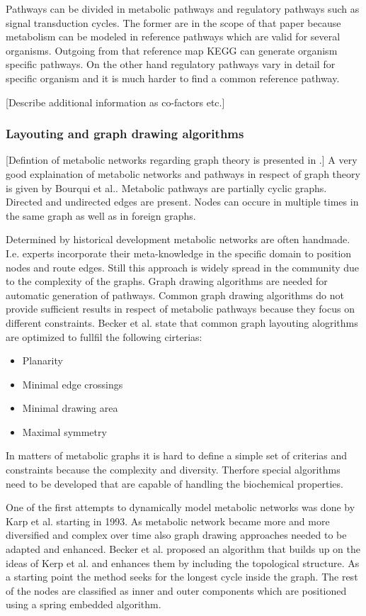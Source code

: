 Pathways can be divided in metabolic pathways and regulatory pathways such as signal transduction cycles. The former are in the scope of that paper because metabolism can be modeled in reference pathways which are valid for several organisms\citep{Kanehisa2000}. Outgoing from that reference map KEGG can generate organism specific pathways. On the other hand regulatory pathways vary in detail for specific organism and it is much harder to find a common reference pathway\citep{Kanehisa2000}.

[Describe additional information as co-factors etc.]

\subsubsection{Layouting and graph drawing algorithms}

[Defintion of metabolic networks regarding graph theory is presented in \citep{Bourqui2006}.]
A very good explaination of metabolic networks and pathways in respect of graph theory is given by Bourqui et al.\citep{Bourqui2006}. 
Metabolic pathways are partially cyclic graphs. Directed and undirected edges are present.
Nodes can occure in multiple times in the same graph as well as in foreign graphs.

Determined by historical development metabolic networks are often handmade. I.e. experts incorporate their meta-knowledge in the specific domain to position nodes and route edges. Still this approach is widely spread in the community due to the complexity of the graphs. Graph drawing algorithms are needed for automatic generation of pathways. Common graph drawing algorithms do not provide sufficient results in respect of metabolic pathways because they focus on different constraints\citep{Becker2001}. Becker et al. state that common graph layouting alogrithms are optimized to fullfil the following cirterias:
\begin{itemize}
 \item Planarity
 \item Minimal edge crossings
 \item Minimal drawing area
 \item Maximal symmetry
\end{itemize}
In matters of metabolic graphs it is hard to define a simple set of criterias and constraints because the complexity and diversity. Therfore special algorithms need to be developed that are capable of handling the biochemical properties.

One of the first attempts to dynamically model metabolic networks was done by Karp et al. starting in 1993\citep{Karp1993, Karp1994, Karp1994a}. As metabolic network became more and more diversified and complex over time also graph drawing approaches needed to be adapted and enhanced. Becker et al. proposed an algorithm that builds up on the ideas of Kerp et al. and enhances them by including the topological structure. As a starting point the method seeks for the longest cycle inside the graph. The rest of the nodes are classified as inner and outer components which are positioned using a spring embedded algorithm.

